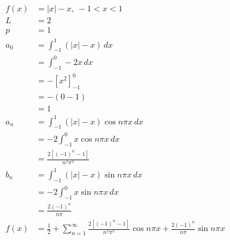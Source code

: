 \documentclass{article}
\begin{document}
\begin{align*}
  f(x) & = |x| - x,\ -1 < x < 1                                                                                                  \\
  L    & = 2                                                                                                                     \\
  p    & = 1                                                                                                                     \\
  a_0  & = \int_{-1}^1 (|x| - x) \,d x                                                                                           \\
       & = \int_{-1}^0 -2 x \,d x                                                                                                \\
       & = -[x^2]_{-1}^0                                                                                                         \\
       & = -(0 - 1)                                                                                                              \\
       & = 1                                                                                                                     \\
  a_n  & = \int_{-1}^1 (|x| - x) \cos n \pi x \,d x                                                                              \\
       & = -2 \int_{-1}^0 x \cos n \pi x \,d x                                                                                   \\
       & = \frac{2 [(-1)^n - 1]}{n^2 \pi^2}                                                                                      \\
  b_n  & = \int_{-1}^1 (|x| - x) \sin n \pi x \,d x                                                                              \\
       & = -2 \int_{-1}^0 x \sin n \pi x \,d x                                                                                   \\
       & = \frac{2 (-1)^n}{n \pi}                                                                                                \\
  f(x) & = \frac{1}{2} + \sum_{n = 1}^\infty \frac{2 [(-1)^n - 1]}{n^2 \pi^2} \cos n \pi x + \frac{2 (-1)^n}{n \pi} \sin n \pi x
\end{align*}
\end{document}
